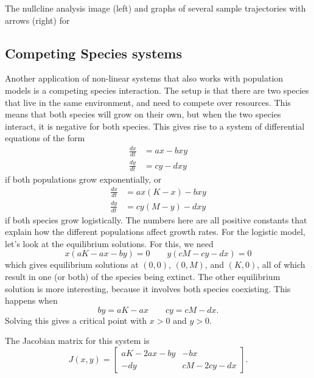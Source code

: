 \begin{myfig}
\capstart
\caption{The nullcline analysis image (left) and graphs of several sample trajectories with arrows (right) for  \label{fig:nlin-pred-prey-nc}}
\end{myfig}

\subsection{Competing Species systems}

Another application of non-linear systems that also works with population models is a competing species interaction. The setup is that there are two species that live in the same environment, and need to compete over resources. This means that both species will grow on their own, but when the two species interact, it is negative for both species. This gives rise to a system of differential equations of the form
\[
\begin{split}
\frac{dx}{dt}&= ax - bxy \\
\frac{dy}{dt}&= cy - dxy  
\end{split}
\]
if both populations grow exponentially, or
\[
\begin{split}
\frac{dx}{dt}&= ax(K-x) - bxy \\
\frac{dy}{dt}&= cy(M-y) - dxy  
\end{split}
\]
if both species grow logistically. The numbers here are all positive constants that explain how the different populations affect growth rates.  For the logistic model, let's look at the equilibrium solutions. For this, we need
\[ x(aK - ax - by) = 0 \qquad y(cM - cy - dx) = 0 \] which gives equilibrium solutions at $(0,0)$, $(0, M)$, and $(K, 0)$, all of which result in one (or both) of the species being extinct. The other equilibrium solution is more interesting, because it involves both species coexisting. This happens when 
\[ by = aK - ax \qquad cy = cM - dx. \] Solving this gives a critical point with $x > 0$ and $y>0$. 

The Jacobian matrix for this system is
\[ J(x,y) = \begin{bmatrix} aK - 2ax - by & -bx \\ -dy & cM - 2cy - dx \end{bmatrix} .\]

